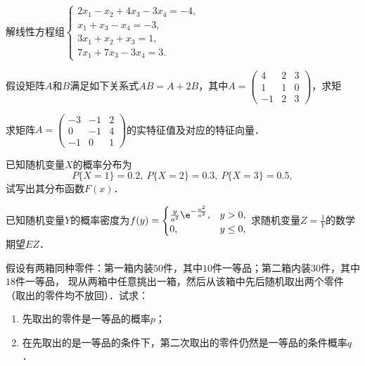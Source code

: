 \documentclass[plain,noanswer,medmath]{../../template/jnuexam}
\begin{document}
\begin{problem}
解线性方程组$\begin{cases}
  2x_1-x_2+4x_3-3x_4=-4, \\
  x_1+x_3-x_4=-3,\\
  3x_1+x_2+x_3=1,\\
  7x_1+7x_3-3x_4=3.
\end{cases}$
\end{problem}



\begin{problem}
假设矩阵$A$和$B$满足如下关系式$AB = A + 2B$，其中$A = \begin{pmatrix}
   4 & 2 & 3 \\
   1 & 1 & 0 \\
  -1 & 2 & 3
\end{pmatrix}$，求矩
\end{problem}



\begin{problem}
求矩阵$A = \begin{pmatrix}
  -3 & -1 & 2 \\
   0 & -1 & 4 \\
  -1 &  0 & 1
\end{pmatrix}$的实特征值及对应的特征向量．
\end{problem}




\begin{problem}
已知随机变量$X$的概率分布为
$$P\{X = 1\} = 0.2,\ P\{X = 2\} = 0.3,\ P\{X = 3\} = 0.5,$$
试写出其分布函数$F(x)$．
\end{problem}


\begin{problem}
已知随机变量$Y$的概率密度为$f(y) = \begin{cases}
  \frac{y}{a^2}\e^{-\frac{u^2}{a^2}}, & y > 0, \\
                                   0, & y \le 0,
\end{cases}$ 求随机变量$Z=\frac{1}{Y}$的数学期望$EZ$．
\end{problem}



\begin{problem}
假设有两箱同种零件：第一箱内装$50$件，其中$10$件一等品；第二箱内装$30$件，其中$18$件一等品，
现从两箱中任意挑出一箱，然后从该箱中先后随机取出两个零件（取出的零件均不放回）．试求：
\begin{enumerate}
\item 先取出的零件是一等品的概率$p$；
\item 在先取出的是一等品的条件下，第二次取出的零件仍然是一等品的条件概率$q$．
\end{enumerate}
\end{problem}
\end{document}
